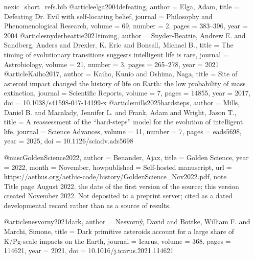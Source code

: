\begin{filecontents}[overwrite]{nexic_short_refs.bib}
@article{elga2004defeating,
  author = {Elga, Adam},
  title = {Defeating {Dr.} {Evil} with self-locating belief},
  journal = {Philosophy and Phenomenological Research},
  volume = {69}, number = {2}, pages = {383--396}, year = {2004}
}
@article{snyderbeattie2021timing,
  author = {Snyder-Beattie, Andrew E. and Sandberg, Anders and Drexler, K. Eric and Bonsall, Michael B.},
  title = {The timing of evolutionary transitions suggests intelligent life is rare},
  journal = {Astrobiology},
  volume = {21}, number = {3}, pages = {265--278}, year = {2021}
}
@article{Kaiho2017,
  author  = {Kaiho, Kunio and Oshima, Naga},
  title   = {Site of asteroid impact changed the history of life on {Earth}: the low probability of mass extinction},
  journal = {Scientific Reports},
  volume  = {7}, pages = {14855}, year = {2017},
  doi     = {10.1038/s41598-017-14199-x}
}
@article{mills2025hardsteps,
  author  = {Mills, Daniel B. and Macalady, Jennifer L. and Frank, Adam and Wright, Jason T.},
  title   = {A reassessment of the ``hard-steps'' model for the evolution of intelligent life},
  journal = {Science Advances},
  volume  = {11}, number = {7}, pages = {eads5698}, year = {2025},
  doi     = {10.1126/sciadv.ads5698}
}

@misc{GoldenScience2022,
  author       = {Benander, Ajax},
  title        = {Golden Science},
  year         = {2022},
  month        = {November},
  howpublished = {Self-hosted manuscript},
  url          = {https://aethus.org/aethic-code/history/GoldenScience_Nov2022.pdf},
  note         = {Title page August 2022, the date of the first version of the source; this version created November 2022. Not deposited to a
                  preprint server; cited as a dated developmental record rather than
                  as a source of results.}
}

@article{nesvorny2021dark,
  author  = {Nesvorn{\'y}, David and Bottke, William F. and Marchi, Simone},
  title   = {Dark primitive asteroids account for a large share of {K/Pg}-scale impacts on the {Earth}},
  journal = {Icarus},
  volume  = {368},
  pages   = {114621},
  year    = {2021},
  doi     = {10.1016/j.icarus.2021.114621}
}
\end{filecontents}
\documentclass[11pt]{article}
\usepackage[margin=1.05in]{geometry}
\usepackage{amsmath, amssymb, amsthm}
\usepackage[hidelinks]{hyperref}
\usepackage{microtype}
\usepackage[style=numeric, sorting=none]{biblatex}


